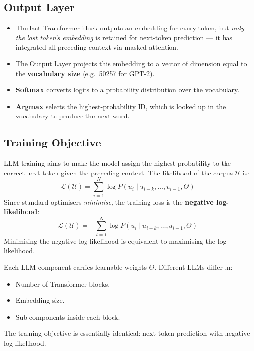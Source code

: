 \documentclass[11pt,a4paper]{article}
\theoremstyle{definition}
\theoremstyle{plain}
\theoremstyle{remark}
\begin{document}
\subsection{Output Layer}

\begin{itemize}
    \item The last Transformer block outputs an embedding for every token, but \emph{only the last token's embedding} is retained for next-token prediction --- it has integrated all preceding context via masked attention.
    \item The Output Layer projects this embedding to a vector of dimension equal to the \textbf{vocabulary size} (e.g.\ 50257 for GPT-2).
    \item \textbf{Softmax} converts logits to a probability distribution over the vocabulary.
    \item \textbf{Argmax} selects the highest-probability ID, which is looked up in the vocabulary to produce the next word.
\end{itemize}

\subsection{Training Objective}

LLM training aims to make the model assign the highest probability to the correct next token given the preceding context. The likelihood of the corpus $\mathcal{U}$ is:
\[
    \mathcal{L}(\mathcal{U}) = \sum_{i=1}^{N} \log P(u_i \mid u_{i-k}, \ldots, u_{i-1}, \Theta)
\]
Since standard optimisers \emph{minimise}, the training loss is the \textbf{negative log-likelihood}:
\[
    \mathcal{L}(\mathcal{U}) = -\sum_{i=1}^{N} \log P(u_i \mid u_{i-k}, \ldots, u_{i-1}, \Theta)
\]
Minimising the negative log-likelihood is equivalent to maximising the log-likelihood.

\begin{tcolorbox}[colback=blue!5!white, colframe=blue!60!black, title={Different LLMs, same recipe}]
Each LLM component carries learnable weights $\Theta$. Different LLMs differ in:
\begin{itemize}
    \item Number of Transformer blocks.
    \item Embedding size.
    \item Sub-components inside each block.
\end{itemize}
The training objective is essentially identical: next-token prediction with negative log-likelihood.
\end{tcolorbox}
\end{document}
